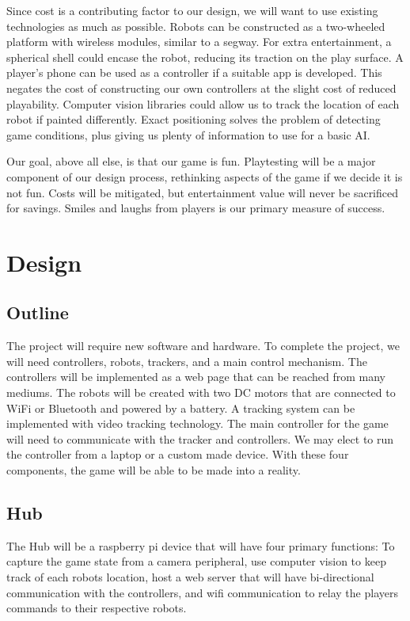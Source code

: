 \documentclass[11pt]{ieeeconf}
\begin{document}
Since cost is a contributing factor to our design, we will want to use existing technologies as much as possible. Robots can be constructed as a two-wheeled platform with wireless modules, similar to a segway. For extra entertainment, a spherical shell could encase the robot, reducing its traction on the play surface. A player’s phone can be used as a controller if a suitable app is developed. This negates the cost of constructing our own controllers at the slight cost of reduced playability. Computer vision libraries could allow us to track the location of each robot if painted differently. Exact positioning solves the problem of detecting game conditions, plus giving us plenty of information to use for a basic AI. 

Our goal, above all else, is that our game is fun. Playtesting will be a major component of our design process, rethinking aspects of the game if we decide it is not fun. Costs will be mitigated, but entertainment value will never be sacrificed for savings. Smiles and laughs from players is our primary measure of success.

\section{Design}

\subsection{Outline}

The project will require new software and hardware. To complete the project, we will need controllers, robots, trackers, and a main control mechanism. The controllers will be implemented as a web page that can be reached from many mediums. The robots will be created with two DC motors that are connected to WiFi or Bluetooth and powered by a battery.  A tracking system can be implemented with video tracking technology. The main controller for the game will need to communicate with the tracker and controllers. We may elect to run the controller from a laptop or a custom made device. With these four components, the game will be able to be made into a reality.

\subsection{Hub}

The Hub will be a raspberry pi device that will have four primary functions: To capture the game state from a camera peripheral, use computer vision to keep track of each robots location, host a web server that will have bi-directional communication with the controllers, and wifi communication to relay the players commands to their respective robots. 
\end{document}
